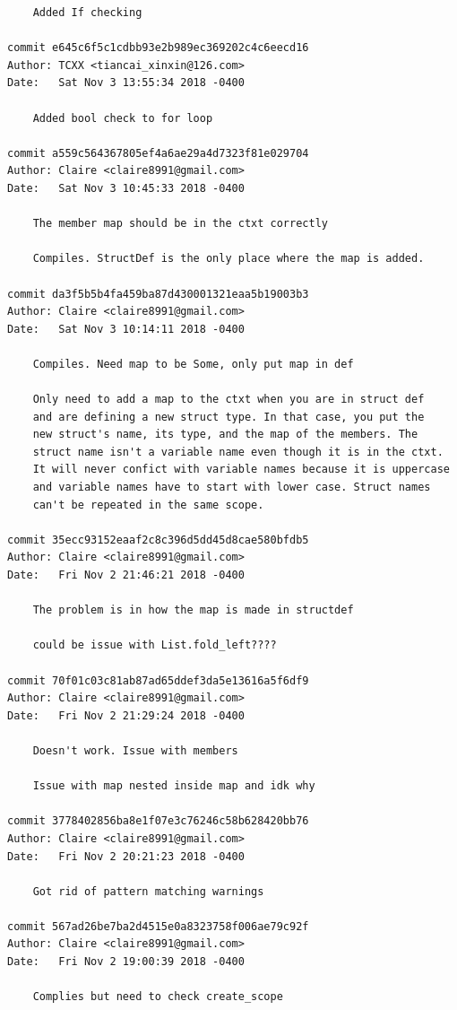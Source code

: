 \documentclass[12pt]{article}
\begin{document}
\begin{lstlisting}
    Added If checking

commit e645c6f5c1cdbb93e2b989ec369202c4c6eecd16
Author: TCXX <tiancai_xinxin@126.com>
Date:   Sat Nov 3 13:55:34 2018 -0400

    Added bool check to for loop

commit a559c564367805ef4a6ae29a4d7323f81e029704
Author: Claire <claire8991@gmail.com>
Date:   Sat Nov 3 10:45:33 2018 -0400

    The member map should be in the ctxt correctly
    
    Compiles. StructDef is the only place where the map is added.

commit da3f5b5b4fa459ba87d430001321eaa5b19003b3
Author: Claire <claire8991@gmail.com>
Date:   Sat Nov 3 10:14:11 2018 -0400

    Compiles. Need map to be Some, only put map in def
    
    Only need to add a map to the ctxt when you are in struct def
    and are defining a new struct type. In that case, you put the
    new struct's name, its type, and the map of the members. The
    struct name isn't a variable name even though it is in the ctxt.
    It will never confict with variable names because it is uppercase
    and variable names have to start with lower case. Struct names
    can't be repeated in the same scope.

commit 35ecc93152eaaf2c8c396d5dd45d8cae580bfdb5
Author: Claire <claire8991@gmail.com>
Date:   Fri Nov 2 21:46:21 2018 -0400

    The problem is in how the map is made in structdef
    
    could be issue with List.fold_left????

commit 70f01c03c81ab87ad65ddef3da5e13616a5f6df9
Author: Claire <claire8991@gmail.com>
Date:   Fri Nov 2 21:29:24 2018 -0400

    Doesn't work. Issue with members
    
    Issue with map nested inside map and idk why

commit 3778402856ba8e1f07e3c76246c58b628420bb76
Author: Claire <claire8991@gmail.com>
Date:   Fri Nov 2 20:21:23 2018 -0400

    Got rid of pattern matching warnings

commit 567ad26be7ba2d4515e0a8323758f006ae79c92f
Author: Claire <claire8991@gmail.com>
Date:   Fri Nov 2 19:00:39 2018 -0400

    Complies but need to check create_scope
    

\end{lstlisting}
\end{document}
